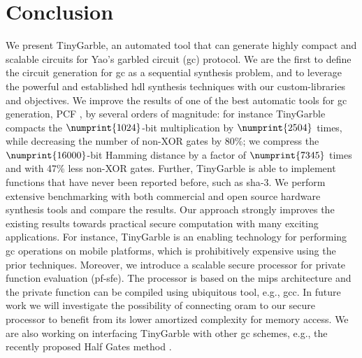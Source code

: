\chapter{Conclusion}
We present TinyGarble, an automated tool that can generate highly compact and scalable circuits for Yao's garbled circuit (\acrshort{gc}) protocol.
We are the first to define the circuit generation for \acrshort{gc} as a sequential synthesis problem, and to leverage the powerful and established \acrshort{hdl} synthesis techniques with our custom-libraries and objectives.
We improve the results of one of the best automatic tools for \acrshort{gc} generation, PCF \cite{kreuter2013pcf}, by several orders of magnitude: for instance TinyGarble compacts the $\numprint{1024}$-bit multiplication by $\numprint{2504}$ times, while decreasing the number of non-XOR gates by 80\%; we compress the $\numprint{16000}$-bit Hamming distance by a factor of $\numprint{7345}$ times and with 47\% less non-XOR gates.
Further, TinyGarble is able to implement functions that have never been reported before, such as \acrshort{sha}-3.
We perform extensive benchmarking with both commercial and open source hardware synthesis tools and compare the results.
Our approach strongly improves the existing results towards practical secure computation with many exciting applications.
For instance, TinyGarble is an enabling technology for performing \acrshort{gc} operations on mobile platforms, which is prohibitively expensive using the prior techniques.
Moreover, we introduce a scalable secure processor for private function evaluation (\acrshort{pf-sfe}).
The processor is based on the \acrshort{mips} architecture and the private function can be compiled using ubiquitous tool, e.g., gcc.
In future work we will investigate the possibility of connecting \acrfull{oram} to our secure processor to benefit from its lower amortized complexity for memory access.
We are also working on interfacing TinyGarble with other \acrshort{gc} schemes, e.g., the recently proposed Half Gates method \cite{zahur2015two}.

